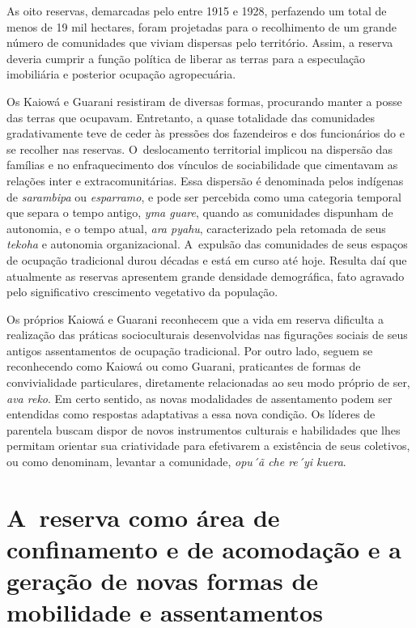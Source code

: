 As oito reservas, demarcadas pelo  entre 1915 e 1928, perfazendo um
total de menos de 19 mil hectares, foram projetadas para o recolhimento
de um grande número de comunidades que viviam dispersas pelo
território. Assim, a reserva deveria cumprir a função política de
liberar as terras para a especulação imobiliária e posterior ocupação
agropecuária. 

Os Kaiowá e Guarani resistiram de diversas formas, procurando manter a
posse das terras que ocupavam. Entretanto, a quase totalidade das
comunidades gradativamente teve de ceder às pressões dos fazendeiros e
dos funcionários do  e se recolher nas reservas. O~deslocamento
territorial implicou na dispersão das famílias e no enfraquecimento dos
vínculos de sociabilidade que cimentavam as relações inter e
extracomunitárias. Essa dispersão é denominada pelos indígenas de
\emph{sarambipa} ou \emph{esparramo}, e pode ser percebida como uma categoria
temporal que separa o tempo antigo, \emph{yma guare}, quando as comunidades
dispunham de autonomia, e o tempo atual, \emph{ara pyahu}, caracterizado pela
retomada de seus \emph{tekoha} e autonomia organizacional. A~expulsão das
comunidades de seus espaços de ocupação tradicional durou décadas e
está em curso até hoje. Resulta daí que atualmente as reservas
apresentem grande densidade demográfica, fato agravado pelo
significativo crescimento vegetativo da população.

Os próprios Kaiowá e Guarani reconhecem que a vida em reserva dificulta
a realização das práticas socioculturais desenvolvidas nas figurações
sociais de seus antigos assentamentos de ocupação tradicional. Por
outro lado, seguem se reconhecendo como Kaiowá ou como Guarani,
praticantes de formas de convivialidade particulares, diretamente
relacionadas ao seu modo próprio de ser, \emph{ava reko}. Em certo sentido, as
novas modalidades de assentamento podem ser entendidas como respostas
adaptativas a essa nova condição. Os líderes de parentela buscam dispor
de novos instrumentos culturais e habilidades que lhes permitam
orientar sua criatividade para efetivarem a existência de seus
coletivos, ou como denominam, levantar a comunidade, \emph{opu´ã che re´yi
kuera}.

\section{A~reserva como área de confinamento e de acomodação e a geração de novas
formas de mobilidade e assentamentos}

